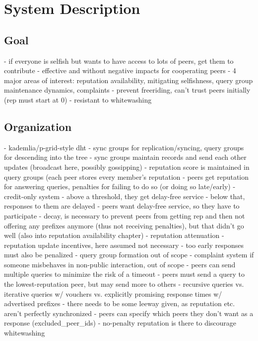 \chapter{System Description}
\section{Goal}
- if everyone is selfish but wants to have access to lots of peers, get them to
  contribute
- effective and without negative impacts for cooperating peers
- 4 major areas of interest: reputation availability, mitigating selfishness,
  query group maintenance dynamics, complaints
- prevent freeriding, can't trust peers initially (rep must start at 0)
- resistant to whitewashing

\section{Organization}
- kademlia/p-grid-style dht
- sync groups for replication/syncing, query groups for descending into the tree
- sync groups maintain records and send each other updates (broadcast here,
  possibly gossipping)
- reputation score is maintained in query groups (each peer stores every
  member's reputation
- peers get reputation for answering queries, penalties for failing to do so (or
  doing so late/early)
- credit-only system
- above a threshold, they get delay-free service
- below that, responses to them are delayed
- peers want delay-free service, so they have to participate
- decay, is necessary to prevent peers from getting rep and then not offering
  any prefixes anymore (thus not receiving penalties), but that didn't go well
  (also into reputation availability chapter)
- reputation attenuation
- reputation update incentives, here assumed not necessary
- too early responses must also be penalized
- query group formation out of scope
- complaint system if someone misbehaves in non-public interaction, out of scope
- peers can send multiple queries to minimize the risk of a timeout
- peers must send a query to the lowest-reputation peer, but may send more to
  others
- recursive queries vs. iterative queries w/ vouchers vs. explicitly promising
  response times w/ advertised prefixes
- there needs to be some leeway given, as reputation etc. aren't perfectly
  synchronized
- peers can specify which peers they don't want as a response
  (excluded\_peer\_ids)
- no-penalty reputation is there to discourage whitewashing
